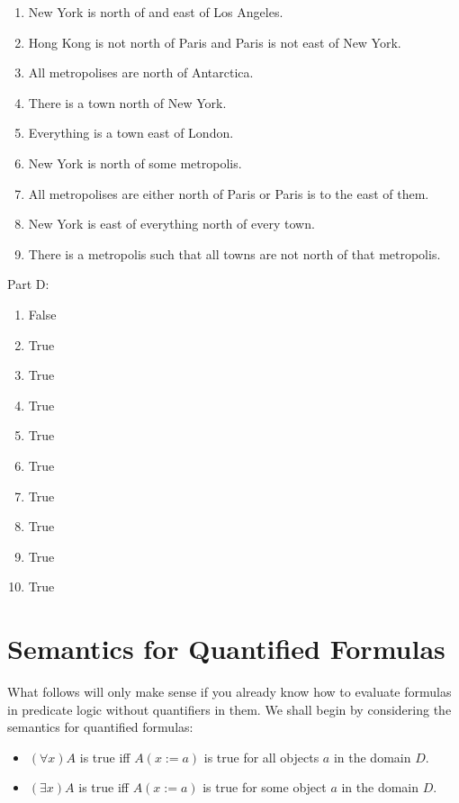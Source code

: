\documentclass[
]{book}
\providecommand{\tightlist}{%
  \setlength{\itemsep}{0pt}\setlength{\parskip}{0pt}}
\begin{document}
\begin{enumerate}
\def\labelenumi{\arabic{enumi}.}
\tightlist
\item
  New York is north of and east of Los Angeles.
\item
  Hong Kong is not north of Paris and Paris is not east of New York.
\item
  All metropolises are north of Antarctica.
\item
  There is a town north of New York.
\item
  Everything is a town east of London.
\item
  New York is north of some metropolis.
\item
  All metropolises are either north of Paris or Paris is to the east of them.
\item
  New York is east of everything north of every town.
\item
  There is a metropolis such that all towns are not north of that metropolis.
\end{enumerate}

Part D:

\begin{enumerate}
\def\labelenumi{\arabic{enumi}.}
\tightlist
\item
  False
\item
  True
\item
  True
\item
  True
\item
  True
\item
  True
\item
  True
\item
  True
\item
  True
\item
  True
\end{enumerate}

\hypertarget{semantics-for-quantified-formulas}{%
\chapter{Semantics for Quantified Formulas}\label{semantics-for-quantified-formulas}}

What follows will only make sense if you already know how to evaluate formulas in predicate logic without quantifiers in them. We shall begin by considering the semantics for quantified formulas:

\begin{itemize}
\tightlist
\item
  \((\forall x)A\) is true iff \(A(x:=a)\) is true for all objects \(a\) in the domain \(D\).
\item
  \((\exists x)A\) is true iff \(A(x:=a)\) is true for some object \(a\) in the domain \(D\).
\end{itemize}
\end{document}

